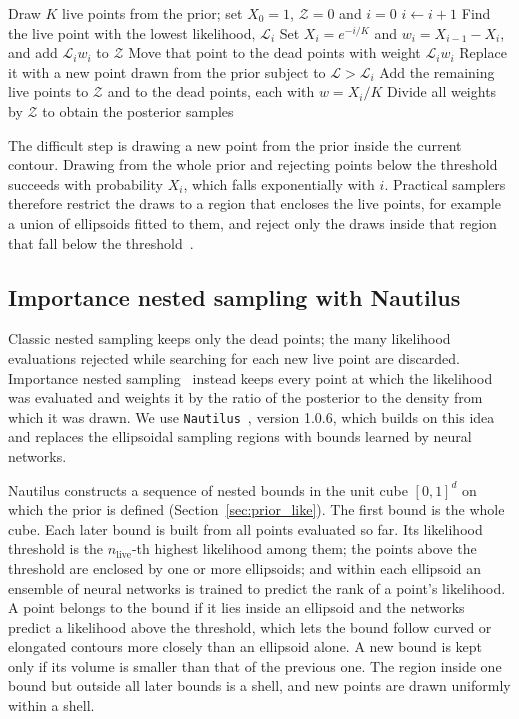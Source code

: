 \begin{algorithm}
\caption{Nested sampling}\label{alg:cap}
\begin{algorithmic}
\State Draw $K$ live points from the prior; set $X_0=1$, $\mathcal{Z}=0$ and $i=0$
\State $i \gets i+1$
\State Find the live point with the lowest likelihood, $\mathcal{L}_i$
\State Set $X_i=e^{-i/K}$ and $w_i=X_{i-1}-X_i$, and add $\mathcal{L}_i w_i$ to $\mathcal{Z}$
\State Move that point to the dead points with weight $\mathcal{L}_i w_i$
\State Replace it with a new point drawn from the prior subject to $\mathcal{L}>\mathcal{L}_i$
\EndWhile
\State Add the remaining live points to $\mathcal{Z}$ and to the dead points, each with $w=X_i/K$
\State Divide all weights by $\mathcal{Z}$ to obtain the posterior samples
\end{algorithmic}
\end{algorithm}

The difficult step is drawing a new point from the prior inside the current contour. Drawing from the whole prior and rejecting points below the threshold succeeds with probability $X_i$, which falls exponentially with $i$. Practical samplers therefore restrict the draws to a region that encloses the live points, for example a union of ellipsoids fitted to them, and reject only the draws inside that region that fall below the threshold~\citep{Feroz_2019}.

\subsection{Importance nested sampling with Nautilus}
Classic nested sampling keeps only the dead points; the many likelihood evaluations rejected while searching for each new live point are discarded. Importance nested sampling~\citep{Feroz_2019} instead keeps every point at which the likelihood was evaluated and weights it by the ratio of the posterior to the density from which it was drawn. We use \texttt{Nautilus}~\citep{Lange2023}, version 1.0.6, which builds on this idea and replaces the ellipsoidal sampling regions with bounds learned by neural networks.

Nautilus constructs a sequence of nested bounds in the unit cube $[0,1]^d$ on which the prior is defined (Section~\ref{sec:prior_like}). The first bound is the whole cube. Each later bound is built from all points evaluated so far. Its likelihood threshold is the $n_{\mathrm{live}}$-th highest likelihood among them; the points above the threshold are enclosed by one or more ellipsoids; and within each ellipsoid an ensemble of neural networks is trained to predict the rank of a point's likelihood. A point belongs to the bound if it lies inside an ellipsoid and the networks predict a likelihood above the threshold, which lets the bound follow curved or elongated contours more closely than an ellipsoid alone. A new bound is kept only if its volume is smaller than that of the previous one. The region inside one bound but outside all later bounds is a shell, and new points are drawn uniformly within a shell.

